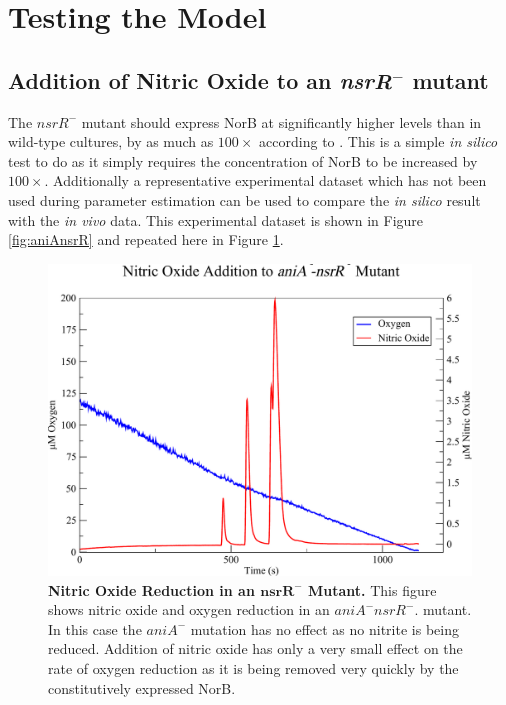 \section{Testing the Model}
\subsection{\texorpdfstring{Addition of Nitric Oxide to an \textit{nsrR}$^-$ mutant}{Addition of Nitric Oxide to an nsrR- mutant}}
The $nsrR^-$ mutant should express NorB at significantly higher levels than in wild-type cultures, by as much as $100\times$ according to \citet{Rock2007}. This is a simple \textit{in silico} test to do as it simply requires the concentration of NorB to be increased by $100\times$. Additionally a representative experimental dataset which has not been used during parameter estimation can be used to compare the \textit{in silico} result with the \textit{in vivo} data. This experimental dataset is shown in Figure \ref{fig:aniAnsrR} and repeated here in Figure \ref{fig:aniAnsrR1}.
\begin{figure}[tbp]
 \centering
 \includegraphics[width=15cm, clip=true]{./09-completedmodel/data/aniA-nsrR.pdf}
 \caption[{Nitric Oxide Reduction in an nsrR Mutant.}]{{\bf Nitric Oxide Reduction in an $\mathbf{nsrR}^-$ Mutant.} This figure shows nitric oxide and oxygen reduction in an $aniA^-nsrR^-$. mutant. In this case the $aniA^-$ mutation has no effect as no nitrite is being reduced. Addition of nitric oxide has only a very small effect on the rate of oxygen reduction as it is being removed very quickly by the constitutively expressed NorB.}
 \label{fig:aniAnsrR1}
\end{figure}
